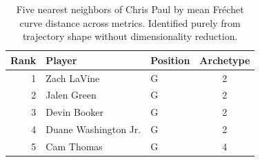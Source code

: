 \begin{table}[htbp]
  \centering\small
  \begin{tabular}{rllc}
    \toprule
    Rank & Player & Position & Archetype \\
    \midrule
    1 & Zach LaVine & G & 2 \\
    2 & Jalen Green & G & 2 \\
    3 & Devin Booker & G & 2 \\
    4 & Duane Washington Jr. & G & 2 \\
    5 & Cam Thomas & G & 4 \\
    \bottomrule
  \end{tabular}
  \caption{Five nearest neighbors of Chris Paul by mean Fr\'{e}chet curve distance across metrics. Identified purely from trajectory shape without dimensionality reduction.}
  \label{tab:Chris_Paul_frechet_curve_neighbors}
\end{table}

